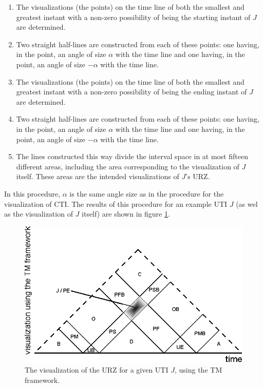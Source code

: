 \begin{enumerate}
	\item The visualizations (the points) on the time line of both the smallest and greatest instant with a non-zero possibility of being the starting instant of $J$ are determined.
	\item Two straight half-lines are constructed from each of these points: one having, in the point, an angle of size $\alpha$ with the time line and one having, in the point, an angle of size $-\alpha$ with the time line.
	\item The visualizations (the points) on the time line of both the smallest and greatest instant with a non-zero possibility of being the ending instant of $J$ are determined.
	\item Two straight half-lines are constructed from each of these points: one having, in the point, an angle of size $\alpha$ with the time line and one having, in the point, an angle of size $-\alpha$ with the time line.
	\item The lines constructed this way divide the interval space in at most fifteen different areas, including the area corresponding to the visualization of $J$ itself. These areas are the intended visualizations of $J$'s URZ.
\end{enumerate}

In this procedure, $\alpha$ is the same angle size as in the procedure for the visualization of CTI. The results of this procedure for an example UTI $J$ (as wel as the visualization of $J$ itself) are shown in figure \ref{fig:tm-urz}. 

\begin{figure}[h]
	\centering
	\includegraphics[width=0.9\columnwidth]{graphs/TM_model_URZ.eps}
	\caption{The visualization of the URZ for a given UTI $J$, using the TM framework.}
	\label{fig:tm-urz}
\end{figure}

